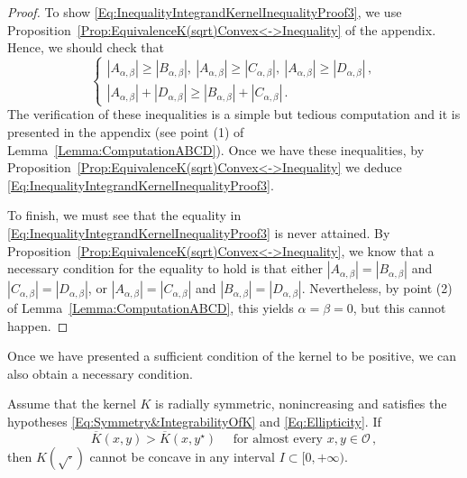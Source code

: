 \begin{proof}
To show \eqref{Eq:InequalityIntegrandKernelInequalityProof3}, we use
Proposition~\ref{Prop:EquivalenceK(sqrt)Convex<->Inequality} of the appendix. Hence, we should
check that
$$
\begin{cases}
|A_{\alpha,\beta}| \geq |B_{\alpha,\beta}|,\ |A_{\alpha,\beta}| \geq |C_{\alpha,\beta}|, \ |A_{\alpha,\beta}| \geq |D_{\alpha,\beta}|\,, \\
|A_{\alpha,\beta}| + |D_{\alpha,\beta}| \geq |B_{\alpha,\beta}| + |C_{\alpha,\beta}|\,.
\end{cases}
$$
The verification of these inequalities is a simple but tedious computation and it is presented in
the appendix (see point (1) of Lemma~\ref{Lemma:ComputationABCD}). Once we have these inequalities,
by Proposition~\ref{Prop:EquivalenceK(sqrt)Convex<->Inequality} we deduce
\eqref{Eq:InequalityIntegrandKernelInequalityProof3}.

To finish, we must see that the equality in \eqref{Eq:InequalityIntegrandKernelInequalityProof3} is
never attained. By Proposition~\ref{Prop:EquivalenceK(sqrt)Convex<->Inequality}, we know that a
necessary condition for the equality to hold is that either $|A_{\alpha,\beta}| =
|B_{\alpha,\beta}|$ and $|C_{\alpha,\beta}| = |D_{\alpha,\beta}|$, or $|A_{\alpha,\beta}| =
|C_{\alpha,\beta}|$ and $|B_{\alpha,\beta}| = |D_{\alpha,\beta}|$. Nevertheless, by point (2) of
Lemma~\eqref{Lemma:ComputationABCD}, this yields $\alpha = \beta = 0$, but this cannot happen.
\end{proof}

Once we have presented a sufficient condition of the kernel to be positive, we can also obtain a
necessary condition.


\begin{proposition}
\label{Prop:ContraryKernelInequalityReflexion} Assume that the kernel $K$ is radially symmetric,
nonincreasing and satisfies the hypotheses \eqref{Eq:Symmetry&IntegrabilityOfK} and
\eqref{Eq:Ellipticity}. If
\begin{equation}
\label{Eq:KernelInequalityReflexion2}
\overline{K}(x,y) > \overline{K}(x, y^\star) \quad \text{ for almost every }x,y \in \mathcal{O}\,,
\end{equation}
then $K(\sqrt{\cdot})$ cannot be concave in any interval $I\subset [0,+\infty)$.
\end{proposition}

